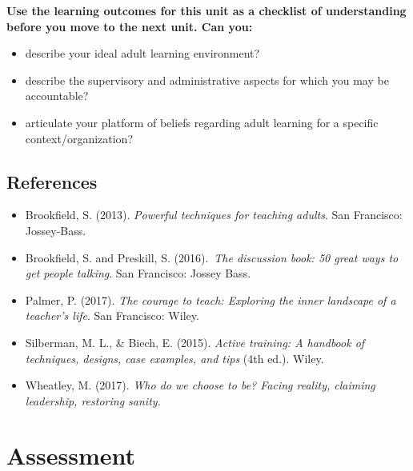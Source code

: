 \documentclass[
]{book}
\providecommand{\tightlist}{%
  \setlength{\itemsep}{0pt}\setlength{\parskip}{0pt}}
\begin{document}
\begin{progress}
\textbf{Use the learning outcomes for this unit as a checklist of
understanding before you move to the next unit. Can you:}

\begin{itemize}
\tightlist
\item
  describe your ideal adult learning environment?\\
\item
  describe the supervisory and administrative aspects for which you may
  be accountable?\\
\item
  articulate your platform of beliefs regarding adult learning for a
  specific context/organization?
\end{itemize}
\end{progress}

\hypertarget{references-5}{%
\section*{References}\label{references-5}}

\begin{itemize}
\tightlist
\item
  Brookfield, S. (2013). \emph{Powerful techniques for teaching adults}. San Francisco: Jossey-Bass.\\
\item
  Brookfield, S. and Preskill, S. (2016).~\emph{The discussion book: 50 great ways to get people talking}. San Francisco: Jossey Bass.\\
\item
  Palmer, P. (2017). \emph{The courage to teach: Exploring the inner landscape of a teacher's life}. San Francisco: Wiley.\\
\item
  Silberman, M. L., \& Biech, E. (2015). \emph{Active training: A handbook of techniques, designs, case examples, and tips} (4th ed.). Wiley.\\
\item
  Wheatley, M. (2017). \emph{Who do we choose to be? Facing reality, claiming leadership, restoring sanity.}
\end{itemize}

\hypertarget{assessment-10}{%
\chapter*{Assessment}\label{assessment-10}}
\end{document}
